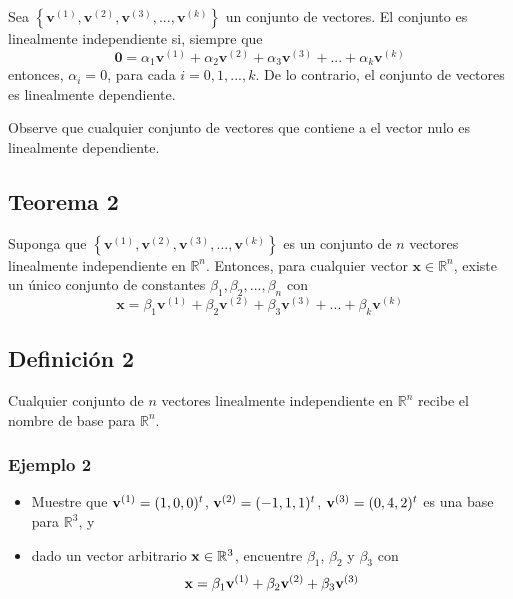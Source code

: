 \documentclass{report}
\numberwithin{subsection}{section} %
\begin{document}
Sea $\left\{ \textbf{v}^{\left( 1 \right)}, \textbf{v}^{\left( 2 \right)}, \textbf{v}^{\left( 3 \right)}, ..., \textbf{v}^{\left( k \right)} \right\}$ un conjunto de vectores. El conjunto es linealmente independiente si, siempre que
\begin{equation}
\textbf{0} = \alpha_{1}\textbf{v}^{\left( 1 \right)} + \alpha_{2}\textbf{v}^{\left( 2 \right)} + \alpha_{3}\textbf{v}^{\left( 3 \right)} + ... + \alpha_{k}\textbf{v}^{\left( k \right)}
\end{equation}
entonces, $\alpha_{i}=0$, para cada $i = 0, 1, ..., k$. De lo contrario, el conjunto de vectores es linealmente dependiente.

Observe que cualquier conjunto de vectores que contiene a el vector nulo es linealmente dependiente.

\subsection{\textnormal{Teorema 2}}

Suponga que $\left\{ \textbf{v}^{\left( 1 \right)}, \textbf{v}^{\left( 2 \right)}, \textbf{v}^{\left( 3 \right)}, ..., \textbf{v}^{\left( k \right)} \right\}$ es un conjunto de $n$ vectores linealmente independiente en $\mathbb{R}^{n}$. Entonces, para cualquier vector $\textbf{x} \in \mathbb{R}^{n}$, existe un único conjunto de constantes $\beta_{1}, \beta_{2}, ..., \beta_{n}$ con
\begin{equation}
\textbf{x} = \beta_{1}\textbf{v}^{\left( 1 \right)} + \beta_{2}\textbf{v}^{\left( 2 \right)} + \beta_{3}\textbf{v}^{\left( 3 \right)} + ... + \beta_{k}\textbf{v}^{\left( k \right)}
\end{equation}

\subsection{\textnormal{Definición 2}}

Cualquier conjunto de $n$ vectores linealmente independiente en $\mathbb{R}^{n}$ recibe el nombre de base para $\mathbb{R}^{n}$.

\subsubsection*{Ejemplo 2}

\begin{itemize}
    \item Muestre que ${\bf v}^{(1)} = (1,0,0)^t$, ${\bf v}^{(2)} = (-1,1,1)^t$, ${\bf v}^{(3)} = (0,4,2)^t$ es una base para $\mathbb{R}^3$, y
    \item dado un vector arbitrario ${\bf x} \in \mathbb{R}^3$, encuentre $\beta_1$, $\beta_2$ y $\beta_3$ con
    $${\bf x} = \beta_1{\bf v}^{(1)} + \beta_2{\bf v}^{(2)} + \beta_3{\bf v}^{(3)}$$
\end{itemize}
\end{document}
